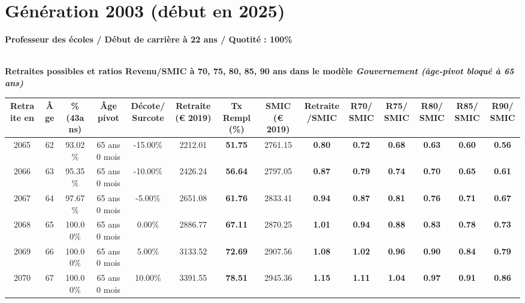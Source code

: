 \section{Génération 2003 (début en 2025)\label{ProfEcoles_100_22_2003_0}} 
 
{\bf \noindent Professeur des écoles / Début de carrière à 22 ans / Quotité : 100\%}  ~ 

 ~\\{\bf \noindent Retraites possibles et ratios Revenu/SMIC à 70, 75, 80, 85, 90 ans dans le modèle \emph{Gouvernement (âge-pivot bloqué à 65 ans)}}  
 
\begin{adjustbox}{max width=\textwidth} 
\begin{tabular}[htb]{|c|c||c|c|c||c|c||c|c||c|c|c|c|c|} 
\hline 
 Retraite en &  Âge &  \%(43ans) &  Âge pivot &  Décote/Surcote &  Retraite (\euro{} 2019) &  Tx Rempl(\%) &  SMIC (\euro{} 2019) &  Retraite/SMIC &  R70/SMIC &  R75/SMIC &  R80/SMIC &  R85/SMIC &  R90/SMIC \\ 
\hline \hline 
 2065 &  62 &  93.02\% &  65 ans 0 mois &  -15.00\% &  2212.01 &  {\bf 51.75} &  2761.15 &  {\bf {\color{red} 0.80}} &  {\bf {\color{red} 0.72}} &  {\bf {\color{red} 0.68}} &  {\bf {\color{red} 0.63}} &  {\bf {\color{red} 0.60}} &  {\bf {\color{red} 0.56}} \\ 
\hline 
 2066 &  63 &  95.35\% &  65 ans 0 mois &  -10.00\% &  2426.24 &  {\bf 56.64} &  2797.05 &  {\bf {\color{red} 0.87}} &  {\bf {\color{red} 0.79}} &  {\bf {\color{red} 0.74}} &  {\bf {\color{red} 0.70}} &  {\bf {\color{red} 0.65}} &  {\bf {\color{red} 0.61}} \\ 
\hline 
 2067 &  64 &  97.67\% &  65 ans 0 mois &  -5.00\% &  2651.08 &  {\bf 61.76} &  2833.41 &  {\bf {\color{red} 0.94}} &  {\bf {\color{red} 0.87}} &  {\bf {\color{red} 0.81}} &  {\bf {\color{red} 0.76}} &  {\bf {\color{red} 0.71}} &  {\bf {\color{red} 0.67}} \\ 
\hline 
 2068 &  65 &  100.00\% &  65 ans 0 mois &  0.00\% &  2886.77 &  {\bf 67.11} &  2870.25 &  {\bf 1.01} &  {\bf {\color{red} 0.94}} &  {\bf {\color{red} 0.88}} &  {\bf {\color{red} 0.83}} &  {\bf {\color{red} 0.78}} &  {\bf {\color{red} 0.73}} \\ 
\hline 
 2069 &  66 &  100.00\% &  65 ans 0 mois &  5.00\% &  3133.52 &  {\bf 72.69} &  2907.56 &  {\bf 1.08} &  {\bf 1.02} &  {\bf {\color{red} 0.96}} &  {\bf {\color{red} 0.90}} &  {\bf {\color{red} 0.84}} &  {\bf {\color{red} 0.79}} \\ 
\hline 
 2070 &  67 &  100.00\% &  65 ans 0 mois &  10.00\% &  3391.55 &  {\bf 78.51} &  2945.36 &  {\bf 1.15} &  {\bf 1.11} &  {\bf 1.04} &  {\bf {\color{red} 0.97}} &  {\bf {\color{red} 0.91}} &  {\bf {\color{red} 0.86}} \\ 
\hline 
\hline 
\end{tabular} 
\end{adjustbox} 
 
